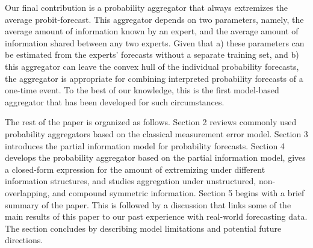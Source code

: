 \documentclass[11pt]{article}
\theoremstyle{definition}
\theoremstyle{definition}
\begin{document}
Our final contribution is a probability aggregator that always extremizes the average probit-forecast. This aggregator depends on two parameters, namely, the average amount of information known by an expert, and the average amount of information shared between any two experts. Given that a) these parameters can be estimated from the experts' forecasts without a separate training set, and b) this aggregator can leave the convex hull of the individual probability forecasts, the aggregator is appropriate for combining interpreted probability forecasts of a one-time event. To the best of our knowledge, this is the first model-based aggregator that has been developed for such circumstances.

 
 
 












The rest of the paper is organized as follows. Section 2 reviews commonly used probability aggregators based on the classical measurement error model. Section 3 introduces the partial information model for probability forecasts. Section 4 develops the probability aggregator based on the partial information model, gives a closed-form expression for the amount of extremizing under different information structures, and studies aggregation under unstructured, non-overlapping, and compound symmetric information. Section 5 begins with a brief summary of the paper. This is followed by a discussion that links some of the main results of this paper to our past experience with real-world forecasting data. The section concludes by describing model limitations and potential future directions. 
\end{document}
